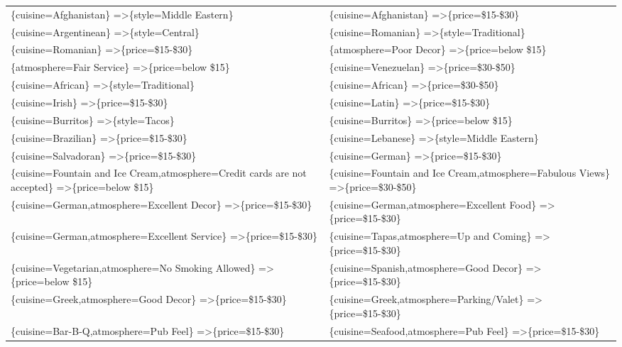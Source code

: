 \documentclass[letterpaper,10pt]{article}
\begin{document}
\begin{appendices}
\begin{table}[h]
\begin{adjustbox}{max width=\textwidth}
\begin{tabular}{ll}
\{cuisine=Afghanistan\} =\textgreater \{style=Middle Eastern\} & \{cuisine=Afghanistan\} =\textgreater \{price=\$15-\$30\} \\
\{cuisine=Argentinean\} =\textgreater \{style=Central\} & \{cuisine=Romanian\} =\textgreater \{style=Traditional\} \\
\{cuisine=Romanian\} =\textgreater \{price=\$15-\$30\} & \{atmosphere=Poor Decor\} =\textgreater \{price=below \$15\} \\
\{atmosphere=Fair Service\} =\textgreater \{price=below \$15\} & \{cuisine=Venezuelan\} =\textgreater \{price=\$30-\$50\} \\
\{cuisine=African\} =\textgreater \{style=Traditional\} & \{cuisine=African\} =\textgreater \{price=\$30-\$50\} \\
\{cuisine=Irish\} =\textgreater \{price=\$15-\$30\} & \{cuisine=Latin\} =\textgreater \{price=\$15-\$30\} \\
\{cuisine=Burritos\} =\textgreater \{style=Tacos\} & \{cuisine=Burritos\} =\textgreater \{price=below \$15\} \\
\{cuisine=Brazilian\} =\textgreater \{price=\$15-\$30\} & \{cuisine=Lebanese\} =\textgreater \{style=Middle Eastern\} \\
\{cuisine=Salvadoran\} =\textgreater \{price=\$15-\$30\} & \{cuisine=German\} =\textgreater \{price=\$15-\$30\} \\
\{cuisine=Fountain and Ice Cream,atmosphere=Credit cards are not accepted\} =\textgreater \{price=below \$15\} & \{cuisine=Fountain and Ice Cream,atmosphere=Fabulous Views\} =\textgreater \{price=\$30-\$50\} \\
\{cuisine=German,atmosphere=Excellent Decor\} =\textgreater \{price=\$15-\$30\} & \{cuisine=German,atmosphere=Excellent Food\} =\textgreater \{price=\$15-\$30\} \\
\{cuisine=German,atmosphere=Excellent Service\} =\textgreater \{price=\$15-\$30\} & \{cuisine=Tapas,atmosphere=Up and Coming\} =\textgreater \{price=\$15-\$30\} \\
\{cuisine=Vegetarian,atmosphere=No Smoking Allowed\} =\textgreater \{price=below \$15\} & \{cuisine=Spanish,atmosphere=Good Decor\} =\textgreater \{price=\$15-\$30\} \\
\{cuisine=Greek,atmosphere=Good Decor\} =\textgreater \{price=\$15-\$30\} & \{cuisine=Greek,atmosphere=Parking/Valet\} =\textgreater \{price=\$15-\$30\} \\
\{cuisine=Bar-B-Q,atmosphere=Pub Feel\} =\textgreater \{price=\$15-\$30\} & \{cuisine=Seafood,atmosphere=Pub Feel\} =\textgreater \{price=\$15-\$30\} \\

\end{tabular}
\end{adjustbox}
\end{table}
\end{appendices}
\end{document}
